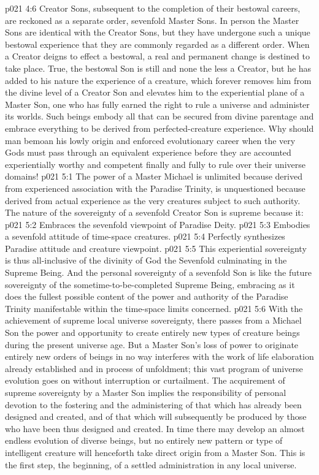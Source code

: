 \pc \vs p021 4:6 Creator Sons, subsequent to the completion of their bestowal careers, are reckoned as a separate order, sevenfold Master Sons. In person the Master Sons are identical with the Creator Sons, but they have undergone such a unique bestowal experience that they are commonly regarded as a different order. When a Creator deigns to effect a bestowal, a real and permanent change is destined to take place. True, the bestowal Son is still and none the less a Creator, but he has added to his nature the experience of a creature, which forever removes him from the divine level of a Creator Son and elevates him to the experiential plane of a Master Son, one who has fully earned the right to rule a universe and administer its worlds. Such beings embody all that can be secured from divine parentage and embrace everything to be derived from perfected\hyp{}creature experience. Why should man bemoan his lowly origin and enforced evolutionary career when the very Gods must pass through an equivalent experience before they are accounted experientially worthy and competent finally and fully to rule over their universe domains!
\vs p021 5:1 The power of a Master Michael is unlimited because derived from experienced association with the Paradise Trinity, is unquestioned because derived from actual experience as the very creatures subject to such authority. The nature of the sovereignty of a sevenfold Creator Son is supreme because it:
\pc \vs p021 5:2 \bibnobreakspace Embraces the sevenfold viewpoint of Paradise Deity.
\vs p021 5:3 \bibnobreakspace Embodies a sevenfold attitude of time\hyp{}space creatures.
\vs p021 5:4 \bibnobreakspace Perfectly synthesizes Paradise attitude and creature viewpoint.
\pc \vs p021 5:5 This experiential sovereignty is thus all\hyp{}inclusive of the divinity of God the Sevenfold culminating in the Supreme Being. And the personal sovereignty of a sevenfold Son is like the future sovereignty of the sometime\hyp{}to\hyp{}be\hyp{}completed Supreme Being, embracing as it does the fullest possible content of the power and authority of the Paradise Trinity manifestable within the time\hyp{}space limits concerned.
\pc \vs p021 5:6 With the achievement of supreme local universe sovereignty, there passes from a Michael Son the power and opportunity to create entirely new types of creature beings during the present universe age. But a Master Son’s loss of power to originate entirely new orders of beings in no way interferes with the work of life elaboration already established and in process of unfoldment; this vast program of universe evolution goes on without interruption or curtailment. The acquirement of supreme sovereignty by a Master Son implies the responsibility of personal devotion to the fostering and the administering of that which has already been designed and created, and of that which will subsequently be produced by those who have been thus designed and created. In time there may develop an almost endless evolution of diverse beings, but no entirely new pattern or type of intelligent creature will henceforth take direct origin from a Master Son. This is the first step, the beginning, of a settled administration in any local universe.\plusone
